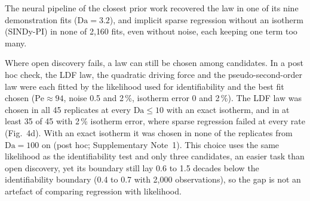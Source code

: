 \documentclass[11pt]{article}
\newcommand{\Da}{\mathrm{Da}}
\newcommand{\Pe}{\mathrm{Pe}}
\begin{document}
The neural pipeline of the closest prior work recovered the law in one of its nine demonstration fits
($\Da = 3.2$), and implicit sparse regression without an isotherm (SINDy-PI) in none of 2{,}160 fits,
even without noise, each keeping one term too many.

Where open discovery fails, a law can still be chosen among candidates. In a post hoc
check, the LDF law, the quadratic driving force and the pseudo-second-order law were each
fitted by the likelihood used for identifiability and the best fit chosen ($\Pe \approx 94$,
noise 0.5 and 2\,\%, isotherm error 0 and 2\,\%). The LDF law was chosen in all 45 replicates at every
$\Da \le 10$ with an exact isotherm, and in at least 35 of 45 with 2\,\% isotherm error, where
sparse regression failed at every rate (Fig.~4d). With an exact isotherm it was chosen in none of the replicates from $\Da = 100$ on (post hoc;
Supplementary Note~1). This choice uses
the same likelihood as the identifiability test and only three candidates, an easier task than open
discovery, yet its boundary still lay 0.6 to 1.5 decades below the identifiability boundary (0.4 to 0.7
with 2,000 observations), so the gap
is not an artefact of comparing regression with likelihood.
\end{document}
